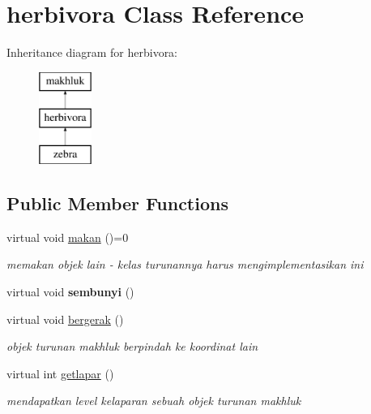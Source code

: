 \hypertarget{classherbivora}{}\section{herbivora Class Reference}
\label{classherbivora}
Inheritance diagram for herbivora\+:\begin{figure}[H]
\begin{center}
\leavevmode
\includegraphics[height=3.000000cm]{classherbivora}
\end{center}
\end{figure}
\subsection*{Public Member Functions}
\begin{DoxyCompactItemize}
\item 
virtual void \hyperlink{classherbivora_ad4ee54fdd628e1863f8bc11289afa5fc}{makan} ()=0\hypertarget{classherbivora_ad4ee54fdd628e1863f8bc11289afa5fc}{}\label{classherbivora_ad4ee54fdd628e1863f8bc11289afa5fc}

\begin{DoxyCompactList}\small\item\em memakan objek lain -\/ kelas turunannya harus mengimplementasikan ini \end{DoxyCompactList}\item 
virtual void {\bfseries sembunyi} ()\hypertarget{classherbivora_ab2f643594070089bf9b0fdd556e4d1c4}{}\label{classherbivora_ab2f643594070089bf9b0fdd556e4d1c4}

\item 
virtual void \hyperlink{classherbivora_af95061149dcaa995cf00471181f5b9cb}{bergerak} ()\hypertarget{classherbivora_af95061149dcaa995cf00471181f5b9cb}{}\label{classherbivora_af95061149dcaa995cf00471181f5b9cb}

\begin{DoxyCompactList}\small\item\em objek turunan makhluk berpindah ke koordinat lain \end{DoxyCompactList}\item 
virtual int \hyperlink{classherbivora_a2d486857a57ee4b56f907c9a0b528a28}{getlapar} ()\hypertarget{classherbivora_a2d486857a57ee4b56f907c9a0b528a28}{}\label{classherbivora_a2d486857a57ee4b56f907c9a0b528a28}

\begin{DoxyCompactList}\small\item\em mendapatkan level kelaparan sebuah objek turunan makhluk \end{DoxyCompactList}\end{DoxyCompactItemize}
